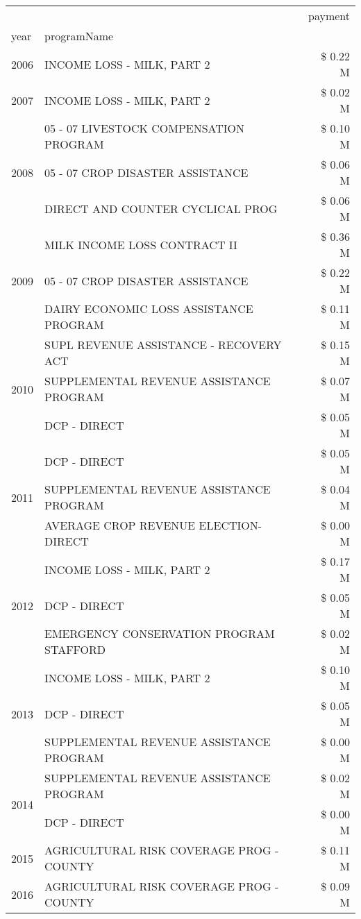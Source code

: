 \begin{tabular}{llr}
\toprule
 &  & payment \\
year & programName &  \\
\midrule
2006 & INCOME LOSS - MILK, PART 2 & \$ 0.22 M \\
\cline{1-3}
2007 & INCOME LOSS - MILK, PART 2 & \$ 0.02 M \\
\cline{1-3}
\multirow[t]{3}{*}{2008} & 05 - 07 LIVESTOCK COMPENSATION PROGRAM & \$ 0.10 M \\
 & 05 - 07 CROP DISASTER ASSISTANCE & \$ 0.06 M \\
 & DIRECT AND COUNTER CYCLICAL PROG & \$ 0.06 M \\
\cline{1-3}
\multirow[t]{3}{*}{2009} & MILK INCOME LOSS CONTRACT II & \$ 0.36 M \\
 & 05 - 07 CROP DISASTER ASSISTANCE & \$ 0.22 M \\
 & DAIRY ECONOMIC LOSS ASSISTANCE PROGRAM & \$ 0.11 M \\
\cline{1-3}
\multirow[t]{3}{*}{2010} & SUPL REVENUE ASSISTANCE - RECOVERY ACT & \$ 0.15 M \\
 & SUPPLEMENTAL REVENUE ASSISTANCE PROGRAM & \$ 0.07 M \\
 & DCP - DIRECT & \$ 0.05 M \\
\cline{1-3}
\multirow[t]{3}{*}{2011} & DCP - DIRECT & \$ 0.05 M \\
 & SUPPLEMENTAL REVENUE ASSISTANCE PROGRAM & \$ 0.04 M \\
 & AVERAGE CROP REVENUE ELECTION-DIRECT & \$ 0.00 M \\
\cline{1-3}
\multirow[t]{3}{*}{2012} & INCOME LOSS - MILK, PART 2 & \$ 0.17 M \\
 & DCP - DIRECT & \$ 0.05 M \\
 & EMERGENCY CONSERVATION PROGRAM STAFFORD & \$ 0.02 M \\
\cline{1-3}
\multirow[t]{3}{*}{2013} & INCOME LOSS - MILK, PART 2 & \$ 0.10 M \\
 & DCP - DIRECT & \$ 0.05 M \\
 & SUPPLEMENTAL REVENUE ASSISTANCE PROGRAM & \$ 0.00 M \\
\cline{1-3}
\multirow[t]{2}{*}{2014} & SUPPLEMENTAL REVENUE ASSISTANCE PROGRAM & \$ 0.02 M \\
 & DCP - DIRECT & \$ 0.00 M \\
\cline{1-3}
2015 & AGRICULTURAL RISK COVERAGE PROG - COUNTY & \$ 0.11 M \\
\cline{1-3}
2016 & AGRICULTURAL RISK COVERAGE PROG - COUNTY & \$ 0.09 M \\

\end{tabular}
